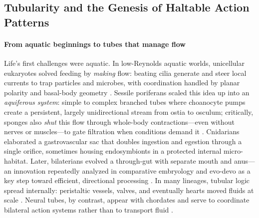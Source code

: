 
\subsection{Tubularity and the Genesis of Haltable Action Patterns}
\label{subsec:tubular}

\paragraph{From aquatic beginnings to tubes that manage flow}
Life’s first challenges were aquatic. In low-Reynolds aquatic worlds, unicellular eukaryotes solved feeding by \emph{making} flow: beating cilia generate and steer local currents to trap particles and microbes, with coordination handled by planar polarity and basal-body geometry \citep{Brooks2014Multiciliated,Shekhar2023CooperativeHydrodynamics}. Sessile poriferans scaled this idea up into an \emph{aquiferous system}: simple to complex branched tubes where choanocyte pumps create a persistent, largely unidirectional stream from ostia to osculum; critically, sponges also \emph{shut} this flow through whole-body contractions—even without nerves or muscles—to gate filtration when conditions demand it \citep{Goldstein2020SpongeContractions,Morganti2019SpongePumping}. Cnidarians elaborated a gastrovascular sac that doubles ingestion and egestion through a single orifice, sometimes housing endosymbionts in a protected internal micro-habitat. Later, bilaterians evolved a through-gut with separate mouth and anus—an innovation repeatedly analyzed in comparative embryology and evo-devo as a key step toward efficient, directional processing \citep{Hejnol2015AnalEvolution,Nielsen2018MouthAnus,Presnell2016ThroughGut}. In many lineages, tubular logic spread internally: peristaltic vessels, valves, and eventually hearts moved fluids at scale \citep{MonahanEarley2013BVS}. Neural tubes, by contrast, appear with chordates and serve to coordinate bilateral action systems rather than to transport fluid \citep{Holland2015ChordateNervous}. 

